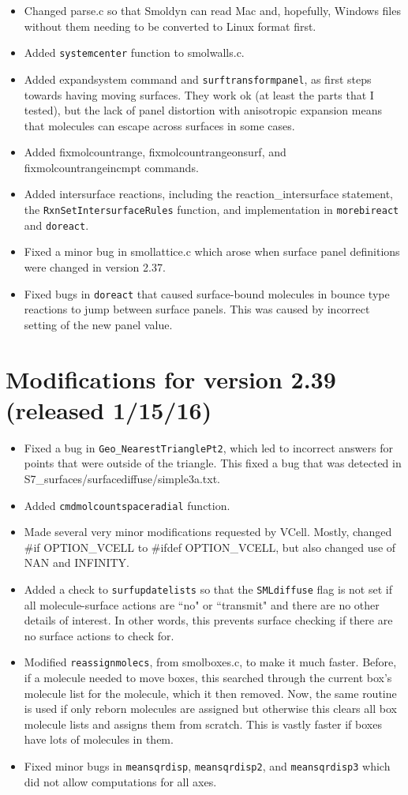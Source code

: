 \documentclass {scrbook}
\newcommand {\ttt} {\texttt}
\begin{document}
\begin{itemize}
\item Changed parse.c so that Smoldyn can read Mac and, hopefully, Windows files without them needing to be converted to Linux format first.
\item Added \ttt{systemcenter} function to smolwalls.c.
\item Added expandsystem command and \ttt{surftransformpanel}, as first steps towards having moving surfaces. They work ok (at least the parts that I tested), but the lack of panel distortion with anisotropic expansion means that molecules can escape across surfaces in some cases.
\item Added fixmolcountrange, fixmolcountrangeonsurf, and fixmolcountrangeincmpt commands.
\item Added intersurface reactions, including the reaction\_intersurface statement, the \ttt{RxnSetIntersurfaceRules} function, and implementation in \ttt{morebireact} and \ttt{doreact}.
\item Fixed a minor bug in smollattice.c which arose when surface panel definitions were changed in version 2.37.
\item Fixed bugs in \ttt{doreact} that caused surface-bound molecules in bounce type reactions to jump between surface panels. This was caused by incorrect setting of the new panel value.
\end{itemize}

\section{Modifications for version 2.39 (released 1/15/16)}
\begin{itemize}
\item Fixed a bug in \ttt{Geo\_NearestTrianglePt2}, which led to incorrect answers for points that were outside of the triangle. This fixed a bug that was detected in S7\_surfaces/surfacediffuse/simple3a.txt.
\item Added \ttt{cmdmolcountspaceradial} function.
\item Made several very minor modifications requested by VCell. Mostly, changed \#if OPTION\_VCELL to \#ifdef OPTION\_VCELL, but also changed use of NAN and INFINITY.
\item Added a check to \ttt{surfupdatelists} so that the \ttt{SMLdiffuse} flag is not set if all molecule-surface actions are ``no" or ``transmit" and there are no other details of interest. In other words, this prevents surface checking if there are no surface actions to check for.
\item Modified \ttt{reassignmolecs}, from smolboxes.c, to make it much faster. Before, if a molecule needed to move boxes, this searched through the current box's molecule list for the molecule, which it then removed. Now, the same routine is used if only reborn molecules are assigned but otherwise this clears all box molecule lists and assigns them from scratch. This is vastly faster if boxes have lots of molecules in them.
\item Fixed minor bugs in \ttt{meansqrdisp}, \ttt{meansqrdisp2}, and \ttt{meansqrdisp3} which did not allow computations for all axes.
\end{itemize}
\end{document}
